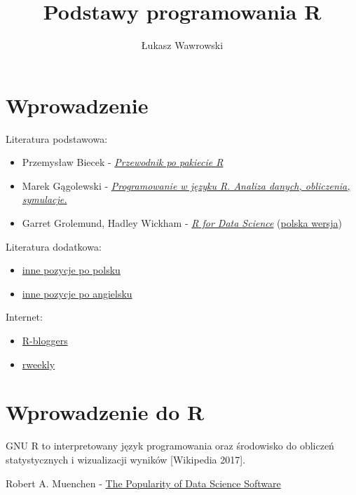 \documentclass[]{book}
\title{Podstawy programowania R}
\author{Łukasz Wawrowski}
\date{}
\providecommand{\tightlist}{%
  \setlength{\itemsep}{0pt}\setlength{\parskip}{0pt}}
\begin{document}
\maketitle

{
\setcounter{tocdepth}{1}
\tableofcontents
}
\chapter*{Wprowadzenie}\label{wprowadzenie}

Literatura podstawowa:

\begin{itemize}
\tightlist
\item
  Przemysław Biecek -
  \href{http://pbiecek.github.io/Przewodnik/}{\emph{Przewodnik po
  pakiecie R}}
\item
  Marek Gągolewski -
  \href{http://www.gagolewski.com/publications/programowanier/}{\emph{Programowanie
  w języku R. Analiza danych, obliczenia, symulacje.}}
\item
  Garret Grolemund, Hadley Wickham -
  \href{http://r4ds.had.co.nz/}{\emph{R for Data Science}}
  (\href{link}{polska wersja})
\end{itemize}

Literatura dodatkowa:

\begin{itemize}
\tightlist
\item
  \href{https://github.com/mi2-warsaw/SER/blob/master/histoRia/README.md}{inne
  pozycje po polsku}
\item
  \href{https://bookdown.org/}{inne pozycje po angielsku}
\end{itemize}

Internet:

\begin{itemize}
\tightlist
\item
  \href{https://www.r-bloggers.com/}{R-bloggers}
\item
  \href{https://rweekly.org/}{rweekly}
\end{itemize}

\chapter{Wprowadzenie do R}\label{wprowadzenie-do-r}

GNU R to interpretowany język programowania oraz środowisko do obliczeń
statystycznych i wizualizacji wyników {[}Wikipedia 2017{]}.

Robert A. Muenchen - \href{http://r4stats.com/articles/popularity/}{The
Popularity of Data Science Software}
\end{document}
